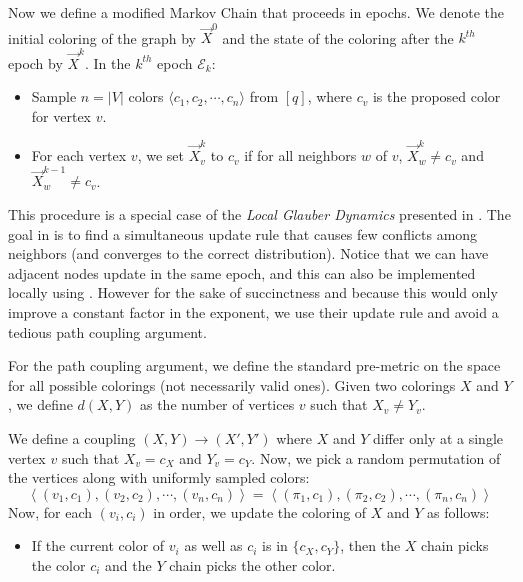 Now we define a modified Markov Chain that proceeds in epochs.
We denote the initial coloring of the graph by $\vec X^0$ and the state of the coloring after the $k^{th}$ epoch by $\vec X^k$.
In the $k^{th}$ epoch $\mathcal E_k$:
\begin{itemize}
    \item Sample $n = |V|$ colors $ \langle c_1, c_2,\cdots, c_n \rangle$ from $[q]$, where $c_v$ is the proposed color for vertex $v$.
    \item For each vertex $v$, we set $\vec X^k_v$ to $c_v$ if for all neighbors $w$ of $v$, $\vec X^k_w\not=c_v$ and $\vec X^{k-1}_w\not=c_v$.
\end{itemize}

This procedure is a special case of the \emph{Local Glauber Dynamics} presented in \cite{mohsen}.
The goal in \cite{mohsen} is to find a simultaneous update rule that causes few conflicts among neighbors (and converges to the correct distribution).
Notice that we can have adjacent nodes update in the same epoch, and this can also be implemented locally using .
However for the sake of succinctness and because this would only improve a constant factor in the exponent,
we use their update rule and avoid a tedious path coupling argument.

For the path coupling argument, we define the standard pre-metric on the space for all possible colorings (not necessarily valid ones).
Given two colorings $X$ and $Y$, we define $d(X,Y)$ as the number of vertices $v$ such that $X_v\not= Y_v$.

We define a coupling $(X,Y)\rightarrow(X',Y')$ where $X$ and $Y$ differ only at a single vertex $v$ such that $X_v = c_X$ and $Y_v = c_Y$.
Now, we pick a random permutation of the vertices along with uniformly sampled colors:
\[
\left\langle (v_1, c_1), (v_2, c_2), \cdots, (v_n, c_n)\right\rangle
= \left\langle (\pi_1, c_1), (\pi_2, c_2), \cdots, (\pi_n, c_n)\right\rangle
\]
Now, for each $(v_i, c_i)$ in order, we update the coloring of $X$ and $Y$ as follows:
\begin{itemize}
    \item If the current color of $v_i$ as well as $c_i$ is in $\{c_X,c_Y\}$,
    then the $X$ chain picks the color $c_i$ and the $Y$ chain picks the other color.
\end{itemize}


